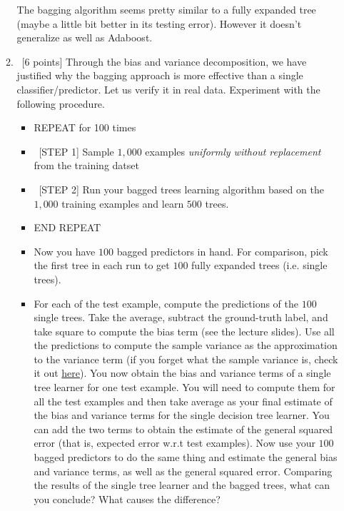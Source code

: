\documentclass[12pt, fullpage,letterpaper]{article}
\begin{document}
\begin{enumerate}
\begin{enumerate}
	\newline
	The bagging algorithm seems pretty similar to a fully expanded tree (maybe a little bit better in its testing error).  However it doesn't generalize as well as Adaboost.
	\item~[6 points] Through the bias and variance decomposition, we have justified why the bagging approach is more effective than a single classifier/predictor. Let us verify it in real data. Experiment with the following procedure.
	\begin{itemize}
		\item REPEAT for 100 times
		\item ~[STEP 1] Sample $1,000$ examples \textit{uniformly without replacement} from the training datset
		\item ~[STEP 2] Run your bagged trees learning algorithm based on the $1,000$ training examples and learn $500$ trees.
		\item END REPEAT 
		\item Now you have $100$ bagged predictors in hand. For comparison, pick the first tree in each run to get $100$ fully expanded trees (i.e. single trees). 
		\item 	For each of the test example, compute the predictions of the $100$ single trees. Take the average, subtract the ground-truth label, and take square to compute the bias term (see the lecture slides). Use all the predictions to compute the sample variance  as the approximation to the variance term (if you forget what the sample variance is, check it out 
		\href{http://www.randomservices.org/random/sample/Variance.html}{here}). You now obtain the bias and variance terms of a single tree learner for one test example. You will need to compute them for all the test examples and then take average as your final estimate of the bias and variance terms for the single decision tree learner. You can add the two terms to obtain the estimate of the general squared error (that is, expected error w.r.t test examples). Now use your $100$ bagged predictors to do the same thing and estimate the general bias and variance terms, as well as the general squared error.  Comparing the results of the single tree learner and the bagged trees, what can you conclude?  What causes the difference?  
	\end{itemize}
	

\end{enumerate}
\end{enumerate}
\end{document}
